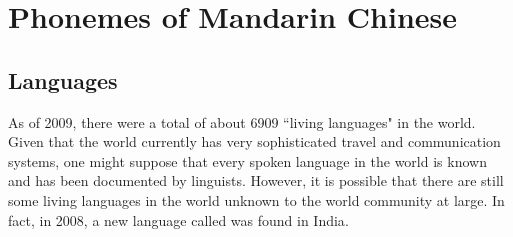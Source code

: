 ﻿%
\chapter{Phonemes of Mandarin Chinese}
\section{Languages}
\begin{minipage}{\tw-75mm}%
  As of 2009, there were a total of about {6909} ``living languages" in the world.
  Given that the world currently has very sophisticated travel and communication systems,
  one might suppose that every spoken language in the world is known and has been documented by 
  linguists. However, it is possible that there are still some living languages in the world 
  unknown to the world community at large.
  In fact, in 2008, a new language called  was found in {India}.\footnotemark
\end{minipage}
  
